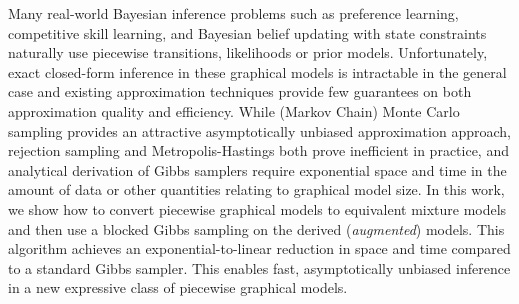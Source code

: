 Many real-world Bayesian inference problems such as preference learning, competitive skill learning, and Bayesian belief updating with state constraints naturally use piecewise transitions, likelihoods or prior models. Unfortunately, exact closed-form inference in these graphical models is intractable in the general case and existing approximation techniques provide few guarantees on both approximation quality and efficiency. While (Markov Chain) Monte Carlo sampling provides an attractive asymptotically unbiased approximation approach, rejection sampling and Metropolis-Hastings both prove inefficient in practice, and analytical derivation of Gibbs samplers require exponential space and time in the amount of data or other quantities relating to graphical model size. 
In this work, we show how to convert piecewise graphical models to equivalent mixture models and then use  a blocked Gibbs sampling on the derived (\emph{augmented}) models. This algorithm achieves an exponential-to-linear reduction in space and time compared to a standard Gibbs sampler. This enables fast, asymptotically unbiased inference in a new expressive class of piecewise graphical models. 